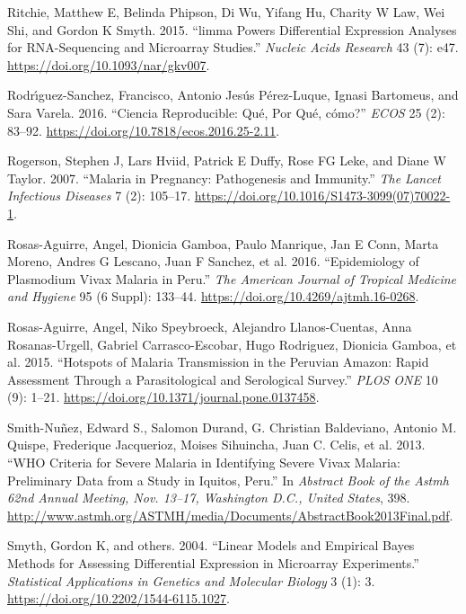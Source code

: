 \documentclass[
  a4paper]{article}
\begin{document}
\leavevmode\hypertarget{ref-limma}{}%
Ritchie, Matthew E, Belinda Phipson, Di Wu, Yifang Hu, Charity W Law,
Wei Shi, and Gordon K Smyth. 2015. ``limma Powers Differential
Expression Analyses for RNA-Sequencing and Microarray Studies.''
\emph{Nucleic Acids Research} 43 (7): e47.
\url{https://doi.org/10.1093/nar/gkv007}.

\leavevmode\hypertarget{ref-CienciaReproducible2016}{}%
Rodrı́guez-Sanchez, Francisco, Antonio Jesús Pérez-Luque, Ignasi
Bartomeus, and Sara Varela. 2016. ``Ciencia Reproducible: Qué, Por Qué,
cómo?'' \emph{ECOS} 25 (2): 83--92.
\url{https://doi.org/10.7818/ecos.2016.25-2.11}.

\leavevmode\hypertarget{ref-rogerson2007preg}{}%
Rogerson, Stephen J, Lars Hviid, Patrick E Duffy, Rose FG Leke, and
Diane W Taylor. 2007. ``Malaria in Pregnancy: Pathogenesis and
Immunity.'' \emph{The Lancet Infectious Diseases} 7 (2): 105--17.
\url{https://doi.org/10.1016/S1473-3099(07)70022-1}.

\leavevmode\hypertarget{ref-rosas2016peru}{}%
Rosas-Aguirre, Angel, Dionicia Gamboa, Paulo Manrique, Jan E Conn, Marta
Moreno, Andres G Lescano, Juan F Sanchez, et al. 2016. ``Epidemiology of
Plasmodium Vivax Malaria in Peru.'' \emph{The American Journal of
Tropical Medicine and Hygiene} 95 (6 Suppl): 133--44.
\url{https://doi.org/10.4269/ajtmh.16-0268}.

\leavevmode\hypertarget{ref-hotspots2015}{}%
Rosas-Aguirre, Angel, Niko Speybroeck, Alejandro Llanos-Cuentas, Anna
Rosanas-Urgell, Gabriel Carrasco-Escobar, Hugo Rodriguez, Dionicia
Gamboa, et al. 2015. ``Hotspots of Malaria Transmission in the Peruvian
Amazon: Rapid Assessment Through a Parasitological and Serological
Survey.'' \emph{PLOS ONE} 10 (9): 1--21.
\url{https://doi.org/10.1371/journal.pone.0137458}.

\leavevmode\hypertarget{ref-smith2013}{}%
Smith-Nuñez, Edward S., Salomon Durand, G. Christian Baldeviano, Antonio
M. Quispe, Frederique Jacquerioz, Moises Sihuincha, Juan C. Celis, et
al. 2013. ``WHO Criteria for Severe Malaria in Identifying Severe Vivax
Malaria: Preliminary Data from a Study in Iquitos, Peru.'' In
\emph{Abstract Book of the Astmh 62nd Annual Meeting, Nov. 13--17,
Washington D.C., United States}, 398.
\url{http://www.astmh.org/ASTMH/media/Documents/AbstractBook2013Final.pdf}.

\leavevmode\hypertarget{ref-smyth2004ebayes}{}%
Smyth, Gordon K, and others. 2004. ``Linear Models and Empirical Bayes
Methods for Assessing Differential Expression in Microarray
Experiments.'' \emph{Statistical Applications in Genetics and Molecular
Biology} 3 (1): 3. \url{https://doi.org/10.2202/1544-6115.1027}.
\end{document}
